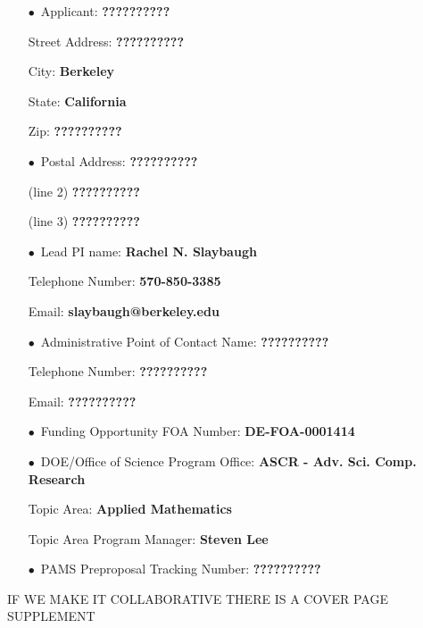 \documentclass[12pt]{article}
\begin{document}
\begin{itemize}[noitemsep,topsep=0pt,parsep=-2pt,partopsep=20pt,labelwidth=7.5cm,align=left,
itemindent=7.5cm]
\item[$\bullet$\, Applicant:] 					{\bf ??????????}
\item[\quad Street Address:] 					{\bf ??????????}  
\item[\quad City:] 									{\bf Berkeley}
\item[\quad State:] 								{\bf California}
\item[\quad Zip:] 									{\bf ??????????}\vspace{12pt}
\item[$\bullet$\, Postal Address:] 			{\bf ??????????} 
\item[\quad (line 2)] 								{\bf ??????????}
\item[\quad (line 3)] 								{\bf ??????????}\vspace{12pt}
\item[$\bullet$\, Lead PI name:] 			{\bf Rachel N. Slaybaugh} 
\item[\quad Telephone Number:]			{\bf 570-850-3385}
\item[\quad Email:]									{\bf slaybaugh@berkeley.edu}\vspace{12pt}
\item[$\bullet$\, Administrative Point of Contact Name:] {\bf ??????????}
\item[\quad Telephone Number:]			{\bf ??????????}
\item[\quad Email:]									{\bf ??????????}\vspace{12pt}
\item[$\bullet$\, Funding Opportunity FOA Number:] {\bf DE-FOA-0001414}\vspace{8pt}
\item[$\bullet$\, DOE/Office of Science Program Office:] {\bf ASCR - Adv. Sci.
 Comp. Research}
\item[\quad Topic Area:]							{\bf Applied Mathematics}
\item[\quad Topic Area Program Manager:] {\bf Steven Lee}\vspace{12pt}
\item[$\bullet$\, PAMS Preproposal Tracking Number:] {\bf ??????????}
\end{itemize}

\pagebreak

IF WE MAKE IT COLLABORATIVE THERE IS A COVER PAGE SUPPLEMENT

\pagebreak
\end{document}
